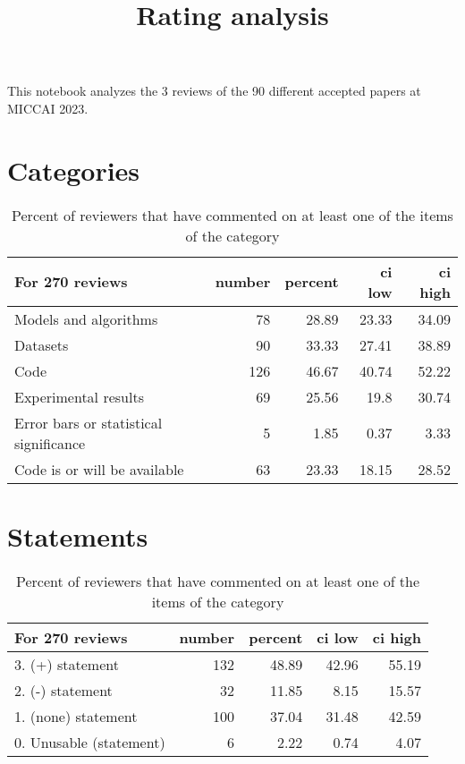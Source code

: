 \documentclass{article}
\title{Rating analysis}
\begin{document}
\maketitle

This notebook analyzes the 3 reviews of the 90 different accepted papers at MICCAI 2023.

\section{Categories} 

\begin{table}[H]

\centering

\begin{tabular}{lrrrr}
\hline
 For 270 reviews                        &   number &   percent &   ci low &   ci high \\
\hline
 Models and algorithms                  &       78 &     28.89 &    23.33 &     34.09 \\
 Datasets                               &       90 &     33.33 &    27.41 &     38.89 \\
 Code                                   &      126 &     46.67 &    40.74 &     52.22 \\
 Experimental results                   &       69 &     25.56 &    19.8  &     30.74 \\
 Error bars or statistical significance &        5 &      1.85 &     0.37 &      3.33 \\
 Code is or will be available           &       63 &     23.33 &    18.15 &     28.52 \\
\hline
\end{tabular}\caption{Percent of reviewers that have commented on at least one of the items of the category}

\end{table}



\section{Statements} 

\begin{table}[H]

\centering

\begin{tabular}{lrrrr}
\hline
 For 270 reviews         &   number &   percent &   ci low &   ci high \\
\hline
 3. (+) statement        &      132 &     48.89 &    42.96 &     55.19 \\
 2. (-) statement        &       32 &     11.85 &     8.15 &     15.57 \\
 1. (none) statement     &      100 &     37.04 &    31.48 &     42.59 \\
 0. Unusable (statement) &        6 &      2.22 &     0.74 &      4.07 \\
\hline
\end{tabular}\caption{Percent of reviewers that have commented on at least one of the items of the category}

\end{table}
\end{document}
